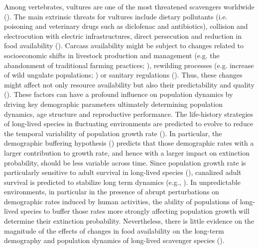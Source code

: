 \documentclass[12pt]{article}
\begin{document}
Among vertebrates, vultures are one of the most threatened scavengers worldwide (\cite{Buechley2016}). The main extrinsic threats for vultures include dietary pollutants (i.e. poisoning and veterinary drugs such as diclofenac and antibiotics), collision and electrocution with electric infrastructures, direct persecution and reduction in food availability (\cite{Ogada2012,Blanco2016,Buechley2016}). Carcass availability might be subject to changes related to socioeconomic shifts in livestock production and management (e.g. the abandonment of traditional farming practices; \cite{Olea2009}), rewilding processes (e.g. increase of wild ungulate populations; \cite{Cortes-Avizanda2015}) or sanitary regulations (\cite{Margalida2010,Blanco2014}). Thus, these changes might affect not only resource availability but also their predictability and quality (\cite{Donazar2009b,Cortes-Avizanda2012,Blanco2014,Blanco2017,Blanco2019a}). These factors can have a profound influence on population dynamics by driving key demographic parameters ultimately determining population dynamics, age structure and reproductive performance. The life-history strategies of long-lived species in fluctuating environments are predicted to evolve to reduce the temporal variability of population growth rate (\cite{Roff2002,Doak2005}). In particular, the demographic buffering hypothesis (\cite{Pfister2002}) predicts that those demographic rates with a larger contribution to growth rate, and hence with a larger impact on extinction probability, should be less variable across time. Since population growth rate is particularly sensitive to adult survival in long-lived species (\cite{Saether2000,Gaillard2010}), canalized adult survival is predicted to stabilize long term dynamics (e.g., \cite{Rotella2019}). In unpredictable environments, in particular in the presence of abrupt perturbations on demographic rates induced by human activities, the ability of populations of long-lived species to buffer those rates more strongly affecting population growth will determine their extinction probability. Nevertheless, there is little evidence on the magnitude of the effects of changes in food availability on the long-term demography and population dynamics of long-lived scavenger species (\cite{Margalida2014b}). \\
\end{document}
